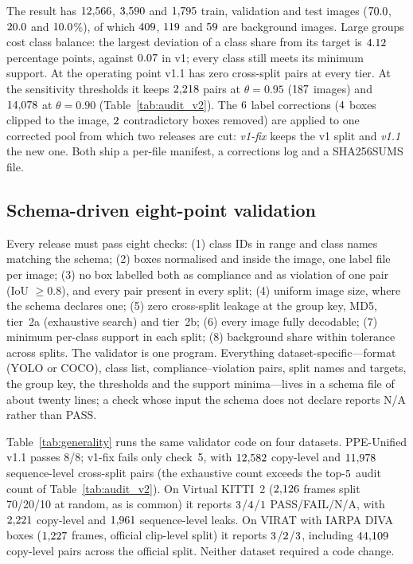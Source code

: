 \documentclass[review,12pt]{elsarticle}
\begin{document}
The result has $12{,}566$, $3{,}590$ and $1{,}795$ train,
validation and test images ($70.0$, $20.0$ and $10.0$\%), of which
$409$, $119$ and $59$ are background images. Large groups cost class balance: the largest
deviation of a class share from its target is $4.12$ percentage
points, against $0.07$ in v1; every class still meets its minimum
support. At the operating point v1.1 has zero cross-split pairs at
every tier. At the sensitivity thresholds it keeps $2{,}218$ pairs
at $\theta=0.95$ ($187$ images) and $14{,}078$ at
$\theta=0.90$ (Table~\ref{tab:audit_v2}). The $6$ label
corrections ($4$ boxes clipped to the image,
$2$ contradictory boxes removed) are applied to one
corrected pool from which two releases are cut: \emph{v1-fix} keeps the
v1 split and \emph{v1.1} the new one. Both ship a per-file manifest, a
corrections log and a SHA256SUMS file.

\subsection{Schema-driven eight-point validation}
\label{sec:validation}
Every release must pass eight checks:
(1) class IDs in range and class names matching the schema;
(2) boxes normalised and inside the image, one label file per image;
(3) no box labelled both as compliance and as violation of one pair
(IoU $\ge0.8$), and every pair present in every split;
(4) uniform image size, where the schema declares one;
(5) zero cross-split leakage at the group key, MD5, tier~2a
(exhaustive search) and tier~2b;
(6) every image fully decodable;
(7) minimum per-class support in each split;
(8) background share within tolerance across splits.
The validator is one program. Everything dataset-specific---format
(YOLO or COCO), class list, compliance--violation pairs, split names
and targets, the group key, the thresholds and the support
minima---lives in a schema file of about twenty lines; a check whose
input the schema does not declare reports N/A rather than PASS.

Table~\ref{tab:generality} runs the same validator code on four
datasets. PPE-Unified v1.1 passes 8/8; v1-fix fails only check~5, with
$12{,}582$ copy-level and $11{,}978$ sequence-level
cross-split pairs (the exhaustive count exceeds the top-$5$
audit count of Table~\ref{tab:audit_v2}). On Virtual KITTI~2
($2{,}126$ frames split 70/20/10 at random, as is common) it reports
$3$/$4$/$1$ PASS/FAIL/N/A, with $2{,}221$
copy-level and $1{,}961$ sequence-level leaks. On VIRAT with
IARPA DIVA boxes ($1{,}227$ frames, official clip-level split) it
reports $3$/$2$/$3$, including $44{,}109$
copy-level pairs across the official split. Neither dataset required a
code change.
\end{document}
